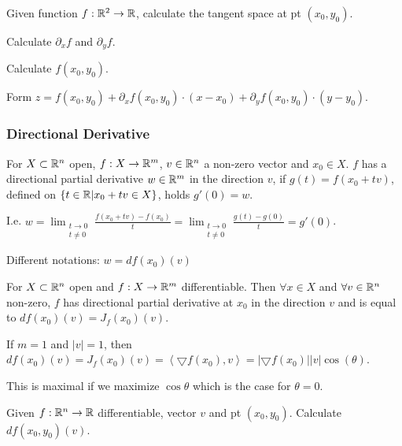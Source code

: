 Given function $f: \mathbb{R}^2 \to \mathbb{R}$, calculate the tangent space at pt $(x_0, y_0)$.

\begin{compactenum}
    \item Calculate $\partial_x f$ and $\partial_y f$.
    \item Calculate $f(x_0, y_0)$.
    \item Form $z = f(x_0, y_0) + \partial_x f(x_0, y_0) \cdot (x - x_0) + \partial_y f (x_0, y_0) \cdot (y - y_0)$.
\end{compactenum}

\subsubsection{Directional Derivative}
For $X \subset \mathbb{R}^n$ open, $f: X \to \mathbb{R}^m$, $v \in \mathbb{R}^n$ a non-zero vector and $x_0 \in X$. $f$ has a directional partial derivative $w \in \mathbb{R}^m$ in the direction $v$, if $g(t) = f(x_0 + tv)$, defined on $\{t \in \mathbb{R} | x_0 + tv \in X\}$, holds $g'(0) = w$.

\begin{compactitem}
    \item I.e. $w = \lim_{\substack{t \to 0\\ t \neq 0}} \frac{f(x_0 + tv) - f(x_0)}{t} = \lim_{\substack{t \to 0\\ t \neq 0}} \frac{g(t) - g(0)}{t} = g'(0)$.
    \item Different notations: $w = df(x_0)(v)$
\end{compactitem}

For $X \subset \mathbb{R}^n$ open and $f: X \to \mathbb{R}^m$ differentiable. Then $\forall x \in X$ and $\forall v \in \mathbb{R}^n$ non-zero, $f$ has directional partial derivative at $x_0$ in the direction $v$ and is equal to $df(x_0) (v) = J_f(x_0)(v)$.

\begin{compactitem}
\item If $m = 1$ and $|v| = 1$, then $df(x_0) (v) = J_f(x_0)(v) = \left<\bigtriangledown f(x_0), v\right> = |\bigtriangledown f(x_0)||v|\cos(\theta)$.
    \begin{compactitem}
        \item This is maximal if we maximize $\cos \theta$ which is the case for $\theta = 0$.
    \end{compactitem}
\end{compactitem}

Given $f: \mathbb{R}^n \to \mathbb{R}$ differentiable, vector $v$ and pt $(x_0, y_0)$. Calculate $df(x_0, y_0)(v)$.

